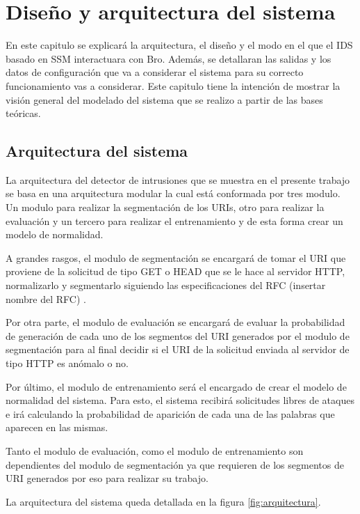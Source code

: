 \chapter{Diseño y arquitectura del sistema}
\label{capitulo3}

En este capitulo se explicará la arquitectura, el diseño y el modo en el que el IDS basado en SSM interactuara con Bro. Además, se detallaran las salidas y los datos de configuración que va a considerar el sistema para su correcto funcionamiento vas a considerar. Este capitulo tiene la intención de mostrar la visión general del modelado del sistema que se realizo a partir de las bases teóricas.

\section{Arquitectura del sistema}

La arquitectura del detector de intrusiones que se muestra en el presente trabajo se basa en una arquitectura modular la cual está conformada por tres modulo. Un modulo para realizar la segmentación de los URIs, otro  para realizar la evaluación y un tercero para realizar el entrenamiento y de esta forma crear un modelo de normalidad.

A grandes rasgos, el modulo de segmentación se encargará de tomar el URI que proviene de la solicitud de tipo GET o HEAD que se le hace al servidor HTTP, normalizarlo y segmentarlo siguiendo las especificaciones del RFC (insertar nombre del RFC) .

Por otra parte, el modulo de evaluación se encargará de evaluar la probabilidad de generación de cada uno de los segmentos del URI generados por el modulo de segmentación para al final decidir si el URI de la solicitud enviada al servidor de tipo HTTP es anómalo o no.

Por último, el modulo de entrenamiento será el encargado de crear el modelo de normalidad del sistema. Para esto, el sistema recibirá solicitudes libres de ataques e irá calculando la probabilidad de aparición de cada una de las palabras que aparecen en las mismas.

Tanto el modulo de evaluación, como el modulo de entrenamiento son dependientes del modulo de segmentación ya que requieren de los segmentos de URI generados por eso para realizar su trabajo. 

La arquitectura del sistema queda detallada en la figura \ref{fig:arquitectura}.

